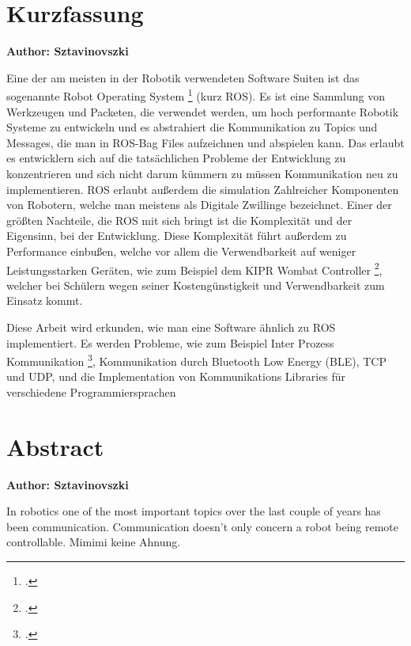 

\chapter{Kurzfassung}

\textbf{Author: Sztavinovszki}

\vspace{10mm}

Eine der am meisten in der Robotik verwendeten Software Suiten ist das sogenannte Robot Operating System \footcite{ros-site} (kurz ROS).
Es ist eine Sammlung von Werkzeugen und Packeten, die verwendet werden, um hoch performante Robotik Systeme zu entwickeln und es abstrahiert
die Kommunikation zu Topics und Messages, die man in ROS-Bag Files aufzeichnen und abspielen kann. Das erlaubt es entwicklern sich auf die tatsächlichen Probleme der Entwicklung zu konzentrieren und sich nicht darum kümmern zu müssen Kommunikation neu zu implementieren.
ROS erlaubt außerdem die simulation Zahlreicher Komponenten von Robotern, welche man meistens als Digitale Zwillinge bezeichnet.
Einer der größten Nachteile, die ROS mit sich bringt ist die Komplexität und der Eigensinn, bei der Entwicklung. Diese Komplexität führt außerdem zu Performance einbußen, welche vor allem die Verwendbarkeit auf weniger Leistungsstarken Geräten, wie zum Beispiel dem KIPR Wombat Controller \footcite{wombat-controller}, welcher bei Schülern wegen seiner Kostengünstigkeit und Verwendbarkeit zum Einsatz kommt.

\medskip

Diese Arbeit wird erkunden, wie man eine Software ähnlich zu ROS implementiert. Es werden Probleme, wie zum Beispiel Inter Prozess Kommunikation \footcite{ipc-begriff}, Kommunikation durch Bluetooth Low Energy (BLE), TCP und UDP, und die Implementation von Kommunikations Libraries für verschiedene Programmiersprachen


\chapter{Abstract}

\textbf{Author: Sztavinovszki}

\vspace{10mm}


In robotics one of the most important topics over the last couple of years has been communication. Communication doesn't only concern a robot being remote controllable. Mimimi keine Ahnung. 







